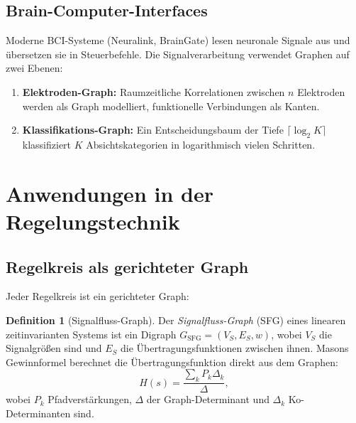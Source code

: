 ﻿\documentclass[12pt,a4paper,twoside]{article}
\theoremstyle{definition}
\newtheorem{definition}{Definition}[section]
\theoremstyle{plain}
\theoremstyle{remark}
\begin{document}
\subsection{Brain-Computer-Interfaces}

Moderne BCI-Systeme (Neuralink, BrainGate) lesen neuronale
Signale aus und übersetzen sie in Steuerbefehle.  Die
Signalverarbeitung verwendet Graphen auf zwei Ebenen:
\begin{enumerate}
  \item \textbf{Elektroden-Graph:} Raumzeitliche Korrelationen
        zwischen $n$ Elektroden werden als Graph modelliert,
        funktionelle Verbindungen als Kanten.
  \item \textbf{Klassifikations-Graph:} Ein Entscheidungsbaum
        der Tiefe $\lceil\log_2 K\rceil$ klassifiziert $K$ Absichtskategorien
        in logarithmisch vielen Schritten.
\end{enumerate}

\section{Anwendungen in der Regelungstechnik}
\label{sec:regelung}

\subsection{Regelkreis als gerichteter Graph}

Jeder Regelkreis ist ein gerichteter Graph:

\begin{definition}[Signalfluss-Graph]
Der \emph{Signalfluss-Graph} (SFG) eines linearen
zeitinvarianten Systems ist ein Digraph $G_{\text{SFG}}=(V_S,E_S,w)$,
wobei $V_S$ die Signalgrößen sind und $E_S$ die Übertragungsfunktionen
zwischen ihnen.  Masons Gewinnformel berechnet die
Übertragungsfunktion direkt aus dem Graphen:
\[
  H(s) = \frac{\sum_k P_k \Delta_k}{\Delta},
\]
wobei $P_k$ Pfadverstärkungen, $\Delta$ der Graph-Determinant
und $\Delta_k$ Ko-Determinanten sind.
\end{definition}
\end{document}
